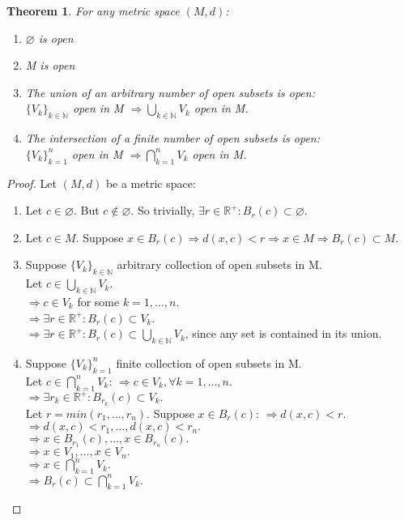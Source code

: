 \documentclass{article}
\newtheorem{theorem}{Theorem}[section]
\begin{document}
			\begin{theorem}
				For any metric space $(M, d)$:
				\begin{enumerate}
					\item $\varnothing$ is open
					\item M is open
					\item The union of an arbitrary number of open subsets is open: \\
					$\{V_{k}\}_{k \in \mathbb{N}}$ open in M $\Rightarrow \bigcup_{k \in \mathbb{N}} V_{k}$ open in M. 
					\item The intersection of a finite number of open subsets is open: \\
					$\{V_{k}\}_{k=1}^{n}$ open in M $\Rightarrow \bigcap_{k=1}^{n} V_{k}$ open in M.
				\end{enumerate}
			\end{theorem}
			\begin{proof} 
				Let $(M, d)$ be a metric space:
				\begin{enumerate}
					\item Let $c \in \varnothing$. But $c \notin \varnothing$. So trivially, $\exists r \in \mathbb{R^{+}}: B_{r}(c) \subset \varnothing$.
					\item Let $c \in M$. Suppose $x \in B_{r}(c) \Rightarrow d(x, c) < r \Rightarrow x \in M \Rightarrow B_{r}(c) \subset M$.
					\item Suppose $\{V_{k}\}_{k \in \mathbb{N}}$ arbitrary collection of open subsets in M.\\
						Let $c \in \bigcup_{k \in \mathbb{N}} V_{k}$.\\
						$\Rightarrow c \in V_{k}$ for some $k = 1, \ldots, n$.\\
						$\Rightarrow \exists r \in \mathbb{R^{+}}: B_{r}(c) \subset V_{k}$.\\
						$\Rightarrow \exists r \in \mathbb{R^{+}}: B_{r}(c) \subset \bigcup_{k \in \mathbb{N}} V_{k}$, since any set is contained in its union.
					\item Suppose $\{V_{k}\}_{k=1}^{n}$ finite collection of open subsets in M.\\
						Let $c \in \bigcap_{k=1}^{n} V_{k}$:
						$\Rightarrow c \in V_{k}, \forall k = 1, \ldots, n.$ \\
						$\Rightarrow \exists r_{k} \in \mathbb{R^{+}}: B_{r_{k}}(c) \subset V_{k}.$ \\
						Let $r = min(r_{1}, \ldots, r_{n})$. Suppose $x \in B_{r}(c)$:
						$\Rightarrow d(x, c) < r.$ \\
						$\Rightarrow d(x, c) < r_{1}, \ldots, d(x, c) < r_{n}.$ \\
						$\Rightarrow x \in B_{r_{1}}(c), \ldots, x \in B_{r_{n}}(c).$ \\
						$\Rightarrow x \in V_{1}, \ldots, x \in V_{n}.$ \\
						$\Rightarrow x \in \bigcap_{k=1}^{n} V_{k}.$ \\
						$\Rightarrow B_{r}(c) \subset \bigcap_{k=1}^{n} V_{k}.$
				\end{enumerate}
			\end{proof}
\end{document}
